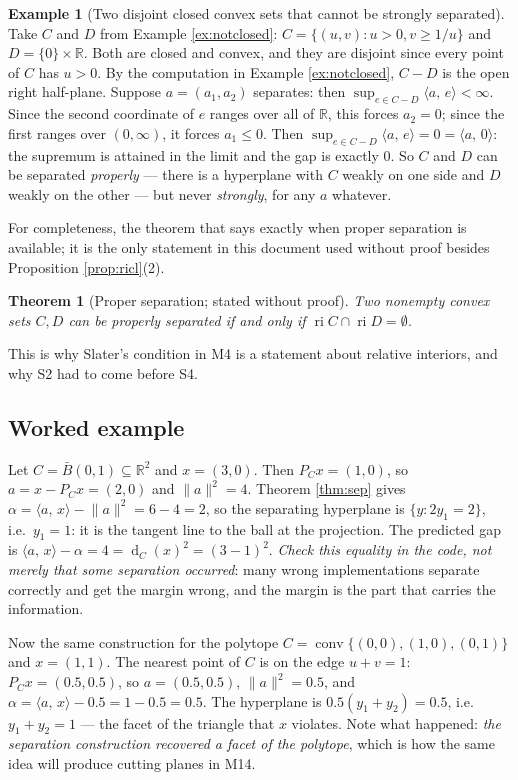 \documentclass[11pt,a4paper]{article}
\theoremstyle{definition}
\newtheorem{example}[definition]{Example}
\theoremstyle{plain}
\newtheorem{theorem}{Theorem}
\theoremstyle{remark}
\newcommand{\R}{\mathbb{R}}
\newcommand{\ip}[2]{\langle #1,\, #2\rangle}
\newcommand{\norm}[1]{\lVert #1\rVert}
\newcommand{\proj}{P}
\DeclareMathOperator{\conv}{conv}
\DeclareMathOperator{\ri}{ri}
\DeclareMathOperator{\dist}{d}
\begin{document}
\begin{example}[Two disjoint closed convex sets that cannot be strongly separated]
\label{ex:nosep}
Take $C$ and $D$ from Example \ref{ex:notclosed}: $C=\{(u,v):u>0,v\ge1/u\}$ and
$D=\{0\}\times\R$. Both are closed and convex, and they are disjoint since every point of $C$
has $u>0$. By the computation in Example \ref{ex:notclosed}, $C-D$ is the open right half-plane.
Suppose $a=(a_1,a_2)$ separates: then $\sup_{e\in C-D}\ip{a}{e}<\infty$. Since the second
coordinate of $e$ ranges over all of $\R$, this forces $a_2=0$; since the first ranges over
$(0,\infty)$, it forces $a_1\le0$. Then $\sup_{e\in C-D}\ip{a}{e}=0=\ip{a}{0}$: the supremum is
attained in the limit and the gap is exactly $0$. So $C$ and $D$ can be separated
\emph{properly} --- there is a hyperplane with $C$ weakly on one side and $D$ weakly on the
other --- but never \emph{strongly}, for any $a$ whatever.
\end{example}

For completeness, the theorem that says exactly when proper separation is available; it is the
only statement in this document used without proof besides Proposition \ref{prop:ricl}(2).

\begin{theorem}[Proper separation; stated without proof]
\label{thm:proper}
Two nonempty convex sets $C,D$ can be properly separated if and only if
$\ri C\cap\ri D=\emptyset$.
\end{theorem}

This is why Slater's condition in M4 is a statement about relative interiors, and why S2 had to
come before S4.

\subsection*{Worked example}

Let $C=\bar B(0,1)\subseteq\R^2$ and $x=(3,0)$. Then $\proj_Cx=(1,0)$, so $a=x-\proj_Cx=(2,0)$
and $\norm a^2=4$. Theorem \ref{thm:sep} gives $\alpha=\ip{a}{x}-\norm a^2=6-4=2$, so the
separating hyperplane is $\{y:2y_1=2\}$, i.e.\ $y_1=1$: it is the tangent line to the ball at
the projection. The predicted gap is $\ip{a}{x}-\alpha=4=\dist_C(x)^2=(3-1)^2$. \emph{Check
this equality in the code, not merely that some separation occurred}: many wrong implementations
separate correctly and get the margin wrong, and the margin is the part that carries the
information.

Now the same construction for the polytope $C=\conv\{(0,0),(1,0),(0,1)\}$ and $x=(1,1)$. The
nearest point of $C$ is on the edge $u+v=1$: $\proj_Cx=(0.5,0.5)$, so $a=(0.5,0.5)$,
$\norm a^2=0.5$, and $\alpha=\ip{a}{x}-0.5=1-0.5=0.5$. The hyperplane is
$0.5(y_1+y_2)=0.5$, i.e.\ $y_1+y_2=1$ --- the facet of the triangle that $x$ violates. Note what
happened: \emph{the separation construction recovered a facet of the polytope}, which is how the
same idea will produce cutting planes in M14.
\end{document}
